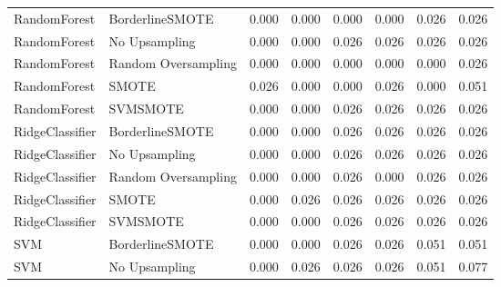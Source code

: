 \begin{tabular}{llllllll}
                RandomForest &     BorderlineSMOTE & 0.000 &                     0.000 &                 0.000 &                  0.000 &                                   0.026 &     0.026 \\
                RandomForest &       No Upsampling & 0.000 &                     0.000 &                 0.026 &                  0.026 &                                   0.026 &     0.026 \\
                RandomForest & Random Oversampling & 0.000 &                     0.000 &                 0.000 &                  0.000 &                                   0.000 &     0.026 \\
                RandomForest &               SMOTE & 0.026 &                     0.000 &                 0.000 &                  0.026 &                                   0.000 &     0.051 \\
                RandomForest &            SVMSMOTE & 0.000 &                     0.000 &                 0.026 &                  0.026 &                                   0.026 &     0.026 \\
             RidgeClassifier &     BorderlineSMOTE & 0.000 &                     0.000 &                 0.026 &                  0.026 &                                   0.026 &     0.026 \\
             RidgeClassifier &       No Upsampling & 0.000 &                     0.000 &                 0.026 &                  0.026 &                                   0.026 &     0.026 \\
             RidgeClassifier & Random Oversampling & 0.000 &                     0.000 &                 0.026 &                  0.000 &                                   0.026 &     0.026 \\
             RidgeClassifier &               SMOTE & 0.000 &                     0.026 &                 0.026 &                  0.026 &                                   0.026 &     0.026 \\
             RidgeClassifier &            SVMSMOTE & 0.000 &                     0.000 &                 0.026 &                  0.026 &                                   0.026 &     0.026 \\
                         SVM &     BorderlineSMOTE & 0.000 &                     0.000 &                 0.026 &                  0.026 &                                   0.051 &     0.051 \\
                         SVM &       No Upsampling & 0.000 &                     0.026 &                 0.026 &                  0.026 &                                   0.051 &     0.077 \\

\end{tabular}
